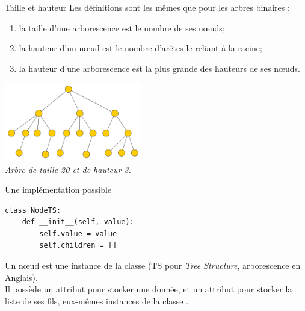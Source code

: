 \documentclass[10pt]{beamer}
\begin{document}
\begin{frame}{Taille et hauteur}
Les définitions sont les mêmes que pour les arbres binaires :
\begin{enumerate}[--]
	\item 	la \alert{taille} d'une arborescence est le nombre de ses n\oe uds;
	\item 	la \alert{hauteur d'un n\oe ud} est le nombre d'arêtes le reliant à la racine;
    \item 	la \alert{hauteur d'une arborescence} est la plus grande des hauteurs de ses n\oe uds.
\end{enumerate}
\begin{center}
\includegraphics[width=6cm]{img/arbo2}\\
\textit{Arbre de taille 20 et de hauteur 3.}
\end{center}
\end{frame}
\begin{frame}[fragile]{Une implémentation possible}
\begin{verbatim}
class NodeTS:
    def __init__(self, value):
        self.value = value
        self.children = []
\end{verbatim}

Un n\oe ud est une instance de la classe  (TS pour \textit{Tree Structure}, arborescence en Anglais).\\
Il possède un attribut  pour stocker une donnée, et un attribut  pour stocker la liste de ses fils, eux-mêmes instances de la classe .
\end{frame}
\end{document}
